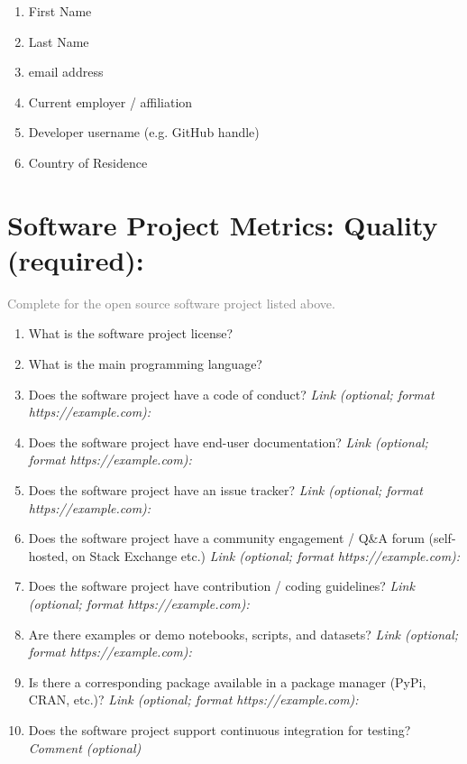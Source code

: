 \begin{enumerate}
    \item First Name
    \item Last Name
    \item email address
    \item Current employer / affiliation
    \item Developer username (e.g. GitHub handle)
    \item Country of Residence
\end{enumerate}

\section{Software Project Metrics: Quality (required):}
\textcolor{gray}{Complete for the open source software project listed above.}

\begin{enumerate}
    \item What is the software project license?
    
    \item What is the main programming language?
    
    \item Does the software project have a code of conduct?
    \subitem \textit{Link (optional; format https://example.com):}
    
    \item Does the software project have end-user documentation?
    \subitem \textit{Link (optional; format https://example.com):}
    
    \item Does the software project have an issue tracker?
    \subitem \textit{Link (optional; format https://example.com):}
    
    \item Does the software project have a community engagement / Q\&A forum (self-hosted, on Stack Exchange etc.)
    \subitem \textit{Link (optional; format https://example.com):}
    
    \item  Does the software project have contribution / coding guidelines?
    \subitem \textit{Link (optional; format https://example.com):}
    
    \item Are there examples or demo notebooks, scripts, and datasets?
    \subitem \textit{Link (optional; format https://example.com):}
    
    \item Is there a corresponding package available in a package manager (PyPi, CRAN, etc.)?
    \subitem \textit{Link (optional; format https://example.com):}
    
    \item Does the software project support continuous integration for testing?
    \subitem \textit{Comment (optional)
}
\end{enumerate}

